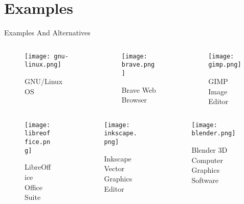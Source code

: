 \documentclass{beamer}
\begin{document}
    \section{Examples}
    \begin{frame}{Examples And Alternatives}
        \begin{columns}
            \begin{column}{0.3\textwidth}
                \begin{figure}
                    \centering
                    \texttt{[image: gnu-linux.png]}
                    \caption{GNU/Linux OS\cite{pngegg}}
                \end{figure}
            \end{column}
            \begin{column}{0.3\textwidth}
                \begin{figure}
                    \centering
                    \texttt{[image: brave.png]}
                    \caption{Brave Web Browser\cite{pngegg}}
                \end{figure}
            \end{column}
            \begin{column}{0.3\textwidth}
                \begin{figure}
                    \centering
                    \texttt{[image: gimp.png]}
                    \caption{GIMP Image Editor\cite{pngegg}}
                \end{figure}
            \end{column}
        \end{columns}
        \begin{columns}
            \begin{column}{0.3\textwidth}
                \begin{figure}
                    \centering
                    \texttt{[image: libreoffice.png]}
                    \caption{LibreOffice Office Suite\cite{pngegg}}
                \end{figure}
            \end{column}
            \begin{column}{0.3\textwidth}
                \begin{figure}
                    \centering
                    \texttt{[image: inkscape.png]}
                    \caption{Inkscape Vector Graphics Editor\cite{pngegg}}
                \end{figure}
            \end{column}
            \begin{column}{0.3\textwidth}
                \begin{figure}
                    \centering
                    \texttt{[image: blender.png]}
                    \caption{Blender 3D Computer Graphics Software\cite{pngegg}}
                \end{figure}
            \end{column}
        \end{columns}
    \end{frame}
\end{document}
